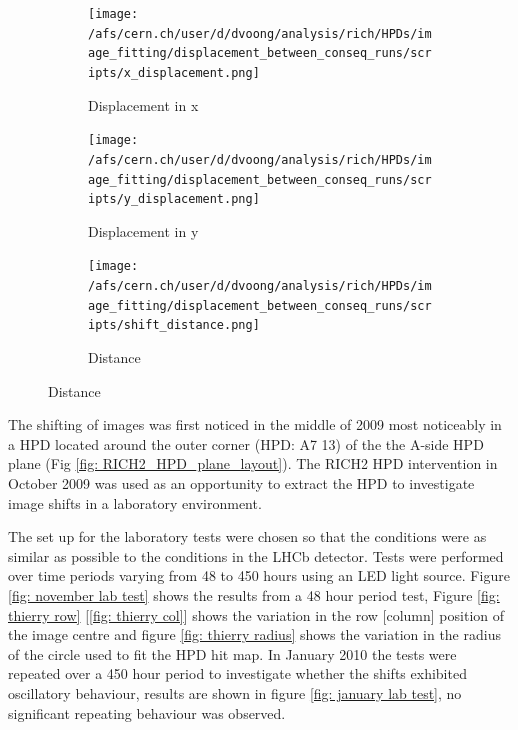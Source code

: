 \begin{figure}
	\begin{center}
		\caption{Image centre x,y displacement and shifts for 2010 tagged consecutive runs ranging from 68179 - 80168}
		\label{fig: 2010 displacement}
		\begin{subfigure}[b]{\textwidth}%
		{
			\begin{center}
				\texttt{[image: /afs/cern.ch/user/d/dvoong/analysis/rich/HPDs/image\_fitting/displacement\_between\_conseq\_runs/scripts/x\_displacement.png]}
			\end{center}
			\caption{Displacement in x}
			\label{fig: x_displacement}
		}
		\end{subfigure}
		\begin{subfigure}[b]{\textwidth}
		{	
			\begin{center}
				\texttt{[image: /afs/cern.ch/user/d/dvoong/analysis/rich/HPDs/image\_fitting/displacement\_between\_conseq\_runs/scripts/y\_displacement.png]}
			\end{center}
			\caption{Displacement in y}
			\label{fig: y_displacement}
		}
		\end{subfigure}
		\begin{subfigure}[b]{\textwidth}
		{
			\begin{center}
				\texttt{[image: /afs/cern.ch/user/d/dvoong/analysis/rich/HPDs/image\_fitting/displacement\_between\_conseq\_runs/scripts/shift\_distance.png]}
			\end{center}
			\caption{Distance}
			\label{fig: shift_distance}
		}
		\end{subfigure}
	\end{center}
\end{figure}

The shifting of images was first noticed in the middle of 2009 most noticeably in a HPD located around the outer corner (HPD: A7 13) of the the A-side HPD plane (Fig \ref{fig: RICH2_HPD_plane_layout}). The RICH2 HPD intervention in October 2009 was used as an opportunity to extract the HPD to investigate image shifts in a laboratory environment. 

The set up for the laboratory tests were chosen so that the conditions were as similar as possible to the conditions in the LHCb detector. Tests were performed over time periods varying from 48 to 450 hours using an LED light source. Figure \ref{fig: november lab test} shows the results from a 48 hour period test, Figure \ref{fig: thierry row} [\ref{fig: thierry col}] shows the variation in the row [column] position of the image centre and figure \ref{fig: thierry radius} shows the variation in the radius of the circle used to fit the HPD hit map. In January 2010 the tests were repeated over a 450 hour period to investigate whether the shifts exhibited oscillatory behaviour, results are shown in figure \ref{fig: january lab test}, no significant repeating behaviour was observed.


